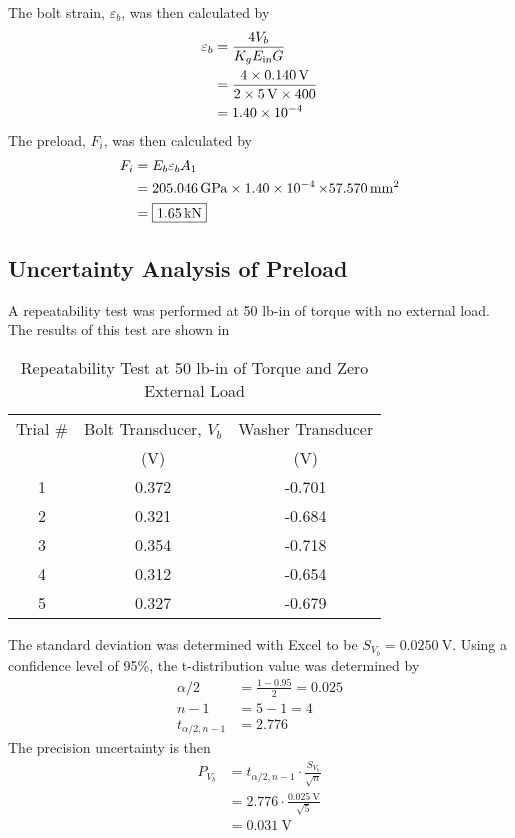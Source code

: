 The bolt strain, $\varepsilon_b$, was then calculated by
\begin{align*}
    \varepsilon_b &= \frac{4 V_b}{K_g E_{\text{in}} G} \\
    &= \frac{4 \times \qty{0.140}{V}}{2 \times \qty{5}{V} \times 400} \\
    &= \qty{1.40E-04}{}
\end{align*}
The preload, $F_i$, was then calculated by
\begin{align*}
    F_i &= E_b \varepsilon_b A_1 \\
    &= \qty{205.046}{\giga\pascal} \times \qty{1.40E-04} \times \qty{57.570}{\milli\meter\squared} \\
    &= \boxed{\qty{1.65}{\kilo\newton}}
\end{align*}

\subsection{Uncertainty Analysis of Preload}
A repeatability test was performed at 50 lb-in of torque with no external load. The results of this test are shown in 
\begin{table}[h]
    \centering
    \caption{Repeatability Test at 50 lb-in of Torque and Zero External Load}
    \label{tab:repeatability_test}
    \begin{tabular}{ccc}
    \toprule
    Trial \# & Bolt Transducer, $V_b$ & Washer Transducer \\
    & (V) & (V) \\
    \midrule
    1 & 0.372 & -0.701 \\
    2 & 0.321 & -0.684 \\
    3 & 0.354 & -0.718 \\
    4 & 0.312 & -0.654 \\
    5 & 0.327 & -0.679 \\
    \bottomrule
    \end{tabular}
\end{table}
The standard deviation was determined with Excel to be $S_{V_b} = \qty{0.0250}{\volt}$. Using a confidence level of 95\%, the t-distribution value was determined by
\begin{align*}
    \alpha/2 &= \frac{1 - 0.95}{2} = 0.025 \\
    n - 1 &= 5 - 1 = 4 \\
    t_{\alpha/2, n-1} &= 2.776
\end{align*}
The precision uncertainty is then
\begin{align*}
    P_{V_b} &= t_{\alpha/2, n-1} \cdot \frac{S_{V_b}}{\sqrt{n}} \\
    &= 2.776 \cdot \frac{\qty{0.025}{\volt}}{\sqrt{5}} \\
    &= \qty{0.031}{\volt}
\end{align*}
